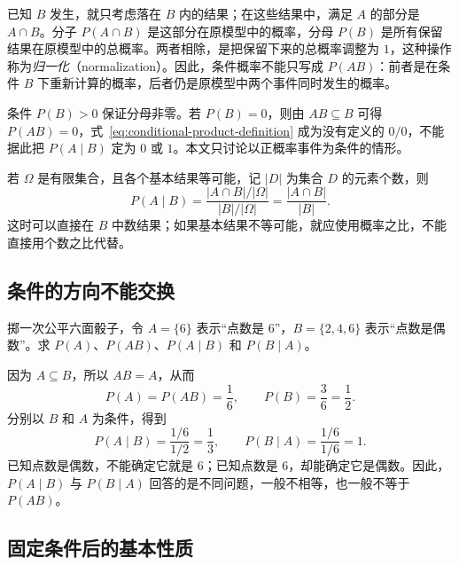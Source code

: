 \documentclass[UTF8,12pt,a4paper,fontset=fandol]{ctexart}
\begin{document}
已知 $B$ 发生，就只考虑落在 $B$ 内的结果；在这些结果中，满足 $A$ 的部分是 $A\cap B$。分子 $P(A\cap B)$ 是这部分在原模型中的概率，分母 $P(B)$ 是所有保留结果在原模型中的总概率。两者相除，是把保留下来的总概率调整为 $1$，这种操作称为\emph{归一化}（normalization）。因此，条件概率不能只写成 $P(AB)$：前者是在条件 $B$ 下重新计算的概率，后者仍是原模型中两个事件同时发生的概率。

条件 $P(B)>0$ 保证分母非零。若 $P(B)=0$，则由 $AB\subseteq B$ 可得 $P(AB)=0$，式~\eqref{eq:conditional-product-definition} 成为没有定义的 $0/0$，不能据此把 $P(A\mid B)$ 定为 $0$ 或 $1$。本文只讨论以正概率事件为条件的情形。

若 $\Omega$ 是有限集合，且各个基本结果等可能，记 $|D|$ 为集合 $D$ 的元素个数，则
\begin{equation}
  P(A\mid B)
  =\frac{|A\cap B|/|\Omega|}{|B|/|\Omega|}
  =\frac{|A\cap B|}{|B|}.
  \label{eq:conditional-product-counting}
\end{equation}
这时可以直接在 $B$ 中数结果；如果基本结果不等可能，就应使用概率之比，不能直接用个数之比代替。

\subsection{条件的方向不能交换}

\begin{example}[同一对事件的两个条件概率]
\label{ex:conditional-product-die}
掷一次公平六面骰子，令 $A=\{6\}$ 表示“点数是 $6$”，$B=\{2,4,6\}$ 表示“点数是偶数”。求 $P(A)$、$P(AB)$、$P(A\mid B)$ 和 $P(B\mid A)$。
\end{example}
\begin{solve}
因为 $A\subseteq B$，所以 $AB=A$，从而
\[
  P(A)=P(AB)=\frac16,\qquad P(B)=\frac36=\frac12.
\]
分别以 $B$ 和 $A$ 为条件，得到
\[
  P(A\mid B)=\frac{1/6}{1/2}=\frac13,
  \qquad
  P(B\mid A)=\frac{1/6}{1/6}=1.
\]
已知点数是偶数，不能确定它就是 $6$；已知点数是 $6$，却能确定它是偶数。因此，$P(A\mid B)$ 与 $P(B\mid A)$ 回答的是不同问题，一般不相等，也一般不等于 $P(AB)$。
\end{solve}

\subsection{固定条件后的基本性质}
\end{document}
